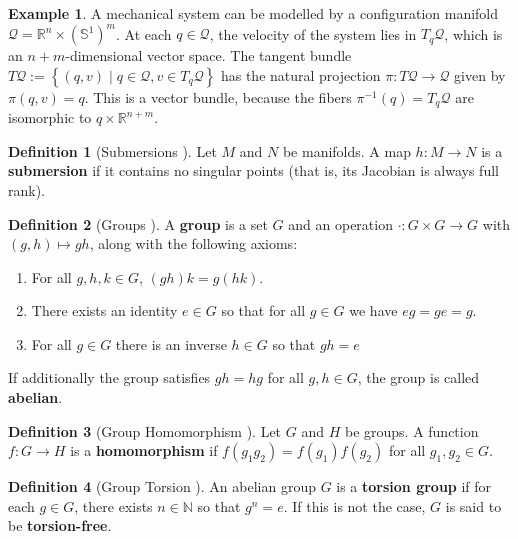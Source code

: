 \documentclass[12pt]{article}
\theoremstyle{definition}
\newtheorem{defn}{Definition}
\newtheorem{example}{Example}
\begin{document}
\begin{example}\label{ex:tangent-bundle}
    A mechanical system can be modelled by a configuration manifold
    \(\mathcal{Q} = \mathbb{R}^n \times (\mathbb{S}^1)^m\). At each
    \(q \in \mathcal{Q}\), the velocity of the system lies in
    \(T_q\mathcal{Q}\), which is an \(n+m\)-dimensional vector
    space. 
    The tangent bundle
    \(T\mathcal{Q} := \left\{(q,v) \mid q \in \mathcal{Q}, v \in
    T_q\mathcal{Q}\right\}\)  has the natural
    projection \(\pi : T\mathcal{Q} \rightarrow \mathcal{Q}\) given by 
    \(\pi(q,v) = q\). This is a vector bundle, because the fibers 
    \(\pi^{-1}(q) = T_q\mathcal{Q}\) are isomorphic to 
    \({q} \times \mathbb{R}^{n+m}\).
\end{example}

\begin{defn}[Submersions \cite{robots-fiber-bundles}]
    Let \(M\) and \(N\) be manifolds. A map \(h : M \rightarrow N\) is a
    \textbf{submersion} if it contains no singular points (that is, its Jacobian
    is always full rank).
\end{defn}

\begin{defn}[Groups \cite{intro-top-manifolds}]
    A \textbf{group} is a set \(G\) and an operation 
    \(\cdot : G\times G \rightarrow G\) with \((g,h) \mapsto gh\), along with
    the following axioms:
    \begin{enumerate}
        \item For all \(g,h,k \in G\), \((gh)k = g(hk)\).
        \item There exists an identity \(e \in G\) so that for all \(g \in G\)
            we have \(eg = ge = g\).
        \item For all \(g \in G\) there is an inverse \(h \in G\) so that
        \(gh = e\)
    \end{enumerate}
    If additionally the group satisfies \(gh = hg\) for all \(g,h \in G\), the
    group is called \textbf{abelian}.
\end{defn}

\begin{defn}[Group Homomorphism \cite{intro-top-manifolds}]
    Let \(G\) and \(H\) be groups. A function \(f : G \rightarrow H\) is a
    \textbf{homomorphism} if \(f(g_1g_2) = f(g_1)f(g_2)\) for all 
    \(g_1,g_2 \in G\).
\end{defn}

\begin{defn}[Group Torsion \cite{intro-top-manifolds}]
    An abelian group \(G\) is a \textbf{torsion group} if for each \(g \in G\),
    there exists \(n \in \mathbb{N}\) so that \(g^n = e\). If this is not the
    case, \(G\) is said to be \textbf{torsion-free}.
\end{defn}
\end{document}

